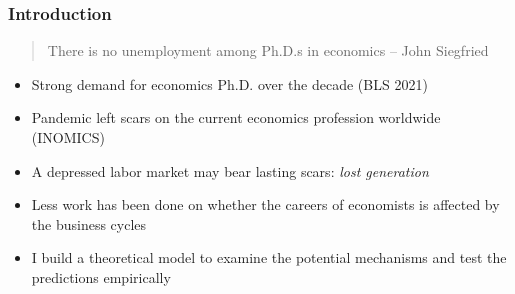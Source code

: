 \documentclass[10pt,svgnames,fragile]{beamer}
\begin{document}
\begin{frame}
	\frametitle{Introduction}
	\begin{quote}
		There is no unemployment among Ph.D.s in economics {\hfill-- John Siegfried}
	\end{quote}
\vfill
	\begin{itemize}
		\item Strong demand for economics Ph.D. over the decade (BLS 2021)
\vfill
		\item Pandemic left scars on the current economics profession worldwide {\footnotesize (INOMICS)}  
\vfill
		\item A depressed labor market may bear lasting scars: \textit{lost generation} 
\vfill
		\item Less work has been done on whether the careers of economists is affected by the business cycles
\vfill
		\item I build a theoretical model to examine the potential mechanisms and test the predictions empirically
\vfill		
	\end{itemize}
\end{frame}
\end{document}
